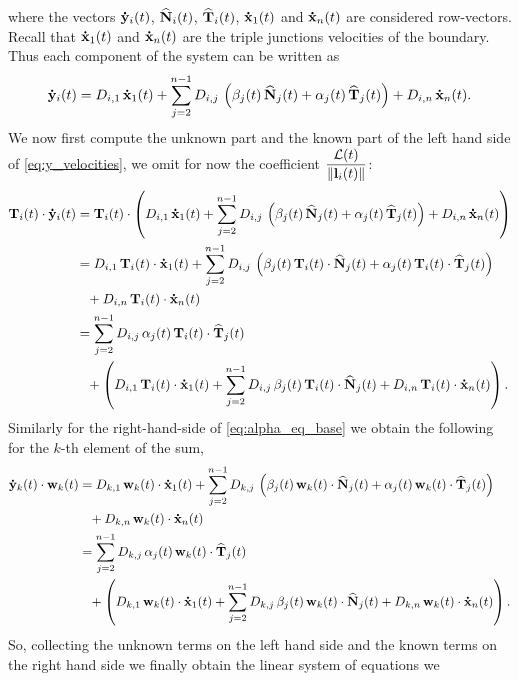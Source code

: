 where the vectors $\doty_{i}(t)$, $\widehat{\mathbf{N}}_i(t)$, $\widehat{\mathbf{T}}_i(t)$, $\dotx_{1}(t)$ and $\dotx_{n}(t)$ are considered row-vectors. Recall that $\dotx_{1}(t)$ and $\dotx_{n}(t)$ are the triple junctions velocities of the boundary. Thus each component of the system can be written as
\begin{equation*}
\doty_{i}(t)
=D_{i,1}\,\dotx_{1}(t)
+\sum_{j=2}^{n-1}D_{i,j}\,\left(\beta_j(t)\,\hatN_j(t)+\alpha_j(t)\,\hatT_j(t)
\right)+D_{i,n}\,\dotx_{n}(t).
\end{equation*}
%
We now first compute the unknown part and the known part of the left hand side of \eqref{eq:y_velocities}, we omit for now the coefficient $\dfrac{\mathcal{L}(t)}{\left\lVert\mathbf{l}_i(t)\right\rVert}$:
%
\begin{align*}
    \T_i(t)\cdot\doty_{i}(t)  &=
    \T_i(t)\cdot\left(D_{i,1}\,\dotx_{1}(t)
+\sum_{j=2}^{n-1}D_{i,j}\,\left(\beta_j(t)\,\hatN_j(t)+\alpha_j(t)\,\hatT_j(t)
\right)+D_{i,n}\,\dotx_{n}(t)\right)\\
&=
    D_{i,1}\,\T_i(t)\cdot\dotx_{1}(t)
+\sum_{j=2}^{n-1}D_{i,j}\,\left(\beta_j(t)\,\T_i(t)\cdot\hatN_j(t)+\alpha_j(t)\,\T_i(t)\cdot\hatT_j(t)
\right)\\
&\phantom{=}+D_{i,n}\,\T_i(t)\cdot\dotx_{n}(t)\\
&=\sum_{j=2}^{n-1}D_{i,j}\,\alpha_j(t)\,\T_i(t)\cdot\hatT_j(t)\\
&\phantom{=}+\left(D_{i,1}\,\T_i(t)\cdot\dotx_{1}(t)+\sum_{j=2}^{n-1}D_{i,j}\,\beta_j(t)\,\T_i(t)\cdot\hatN_j(t)+D_{i,n}\,\T_i(t)\cdot\dotx_{n}(t)\right).
\end{align*}
%
Similarly for the right-hand-side of \eqref{eq:alpha_eq_base} we obtain
the following for the $k$-th element of the sum,
\begin{align*}
    \doty_{k}(t)\cdot \mathbf{w}_k(t)
    &=D_{k,1}\,\mathbf{w}_k(t)\cdot\dotx_{1}(t)
+\sum_{j=2}^{n-1}D_{k,j}\,\left(\beta_j(t)\,\mathbf{w}_k(t)\cdot\hatN_j(t)+\alpha_j(t)\,\mathbf{w}_k(t)\cdot \hatT_j(t)
\right)\\
    &\phantom{=}+D_{k,n}\,\mathbf{w}_k(t)\cdot\dotx_{n}(t)\\
&= \sum_{j=2}^{n-1}D_{k,j}\,\alpha_j(t)\,\mathbf{w}_k(t)\cdot\hatT_j(t)\\
&\phantom{=}+\left(D_{k,1}\,\mathbf{w}_k(t)\cdot\dotx_{1}(t)+\sum_{j=2}^{n-1}D_{k,j}\,\beta_j(t)\,\mathbf{w}_k(t)\cdot\hatN_j(t)+D_{k,n}\,\mathbf{w}_k(t)\cdot\dotx_{n}(t)\right).
\end{align*}
%
So, collecting the unknown terms on the left hand side 
and the known terms on the right hand side we
finally obtain the linear system of equations we
